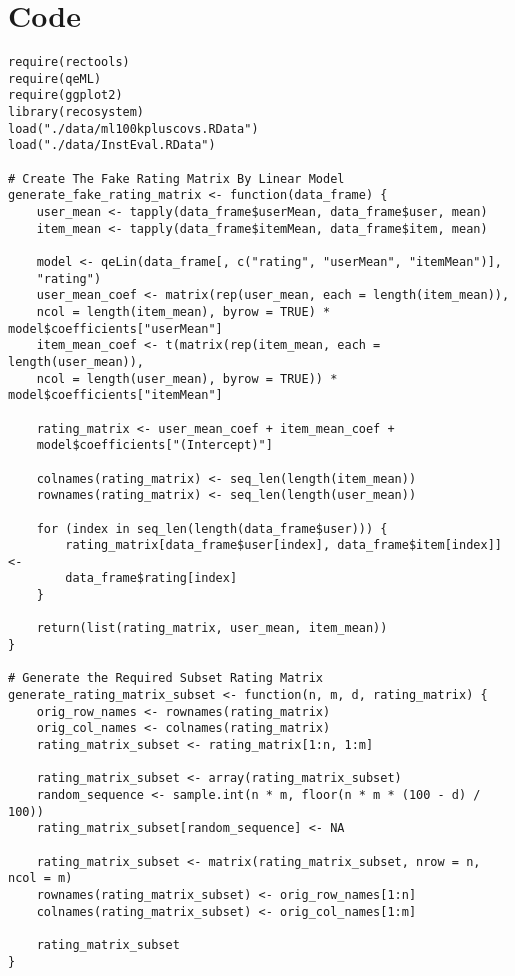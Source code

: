 \documentclass[12pt]{article}
\begin{document}
\newpage
\appendix 
\section{Code}
\begin{singlespace}
\begin{verbatim}
require(rectools)
require(qeML)
require(ggplot2)
library(recosystem)
load("./data/ml100kpluscovs.RData")
load("./data/InstEval.RData")

# Create The Fake Rating Matrix By Linear Model
generate_fake_rating_matrix <- function(data_frame) {
    user_mean <- tapply(data_frame$userMean, data_frame$user, mean)
    item_mean <- tapply(data_frame$itemMean, data_frame$item, mean)

    model <- qeLin(data_frame[, c("rating", "userMean", "itemMean")],
    "rating")
    user_mean_coef <- matrix(rep(user_mean, each = length(item_mean)),
    ncol = length(item_mean), byrow = TRUE) * model$coefficients["userMean"]
    item_mean_coef <- t(matrix(rep(item_mean, each = length(user_mean)),
    ncol = length(user_mean), byrow = TRUE)) * model$coefficients["itemMean"]

    rating_matrix <- user_mean_coef + item_mean_coef +
    model$coefficients["(Intercept)"]

    colnames(rating_matrix) <- seq_len(length(item_mean))
    rownames(rating_matrix) <- seq_len(length(user_mean))

    for (index in seq_len(length(data_frame$user))) {
        rating_matrix[data_frame$user[index], data_frame$item[index]] <-
        data_frame$rating[index]
    }

    return(list(rating_matrix, user_mean, item_mean))
}

# Generate the Required Subset Rating Matrix
generate_rating_matrix_subset <- function(n, m, d, rating_matrix) {
    orig_row_names <- rownames(rating_matrix)
    orig_col_names <- colnames(rating_matrix)
    rating_matrix_subset <- rating_matrix[1:n, 1:m]

    rating_matrix_subset <- array(rating_matrix_subset)
    random_sequence <- sample.int(n * m, floor(n * m * (100 - d) / 100))
    rating_matrix_subset[random_sequence] <- NA

    rating_matrix_subset <- matrix(rating_matrix_subset, nrow = n, ncol = m)
    rownames(rating_matrix_subset) <- orig_row_names[1:n]
    colnames(rating_matrix_subset) <- orig_col_names[1:m]

    rating_matrix_subset
}


\end{verbatim}
\end{singlespace}
\end{document}
